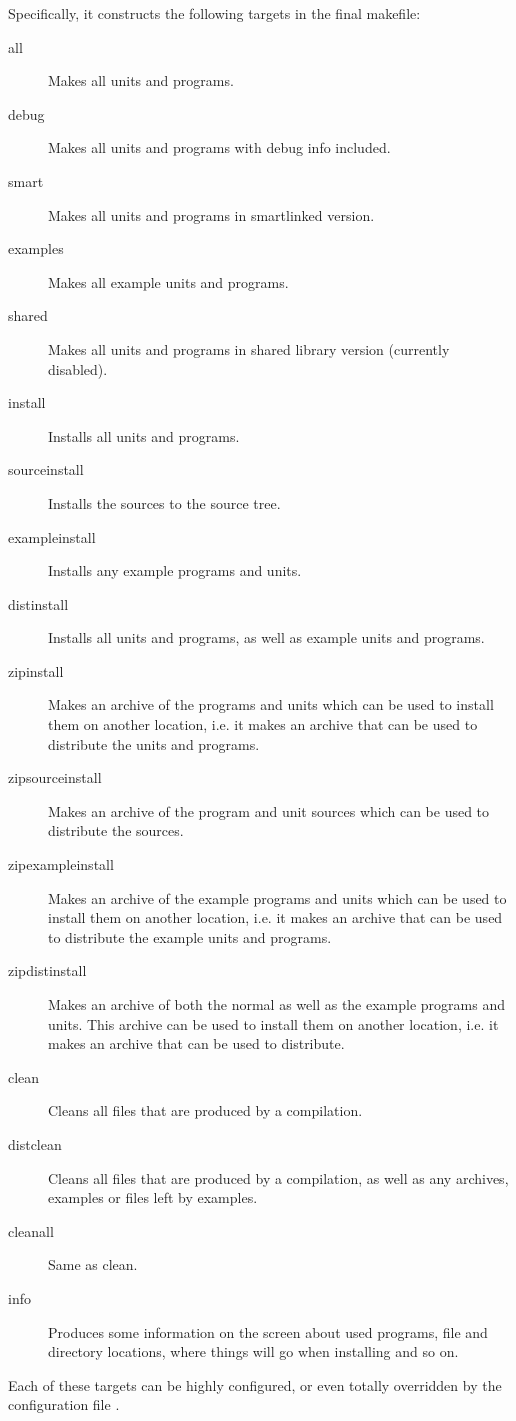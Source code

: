 Specifically, it constructs the following targets in the final makefile:
\begin{description}
\item[all] Makes all units and programs.
\item[debug] Makes all units and programs with debug info included.
\item[smart] Makes all units and programs in smartlinked version.
\item[examples] Makes all example units and programs.
\item[shared] Makes all units and programs in shared library version
(currently disabled).
\item[install] Installs all units and programs.
\item[sourceinstall] Installs the sources to the \fpc source tree.
\item[exampleinstall] Installs any example programs and units.
\item[distinstall] Installs all units and programs, as well as example units
and programs.
\item[zipinstall] Makes an archive of the programs and units which can be
used to install them on another location, i.e. it makes an archive that can
be used to distribute the units and programs.
\item[zipsourceinstall] Makes an archive of the program and unit sources
which can be used to distribute the sources.
\item[zipexampleinstall] Makes an archive of the example programs and units 
which can be used to install them on another location, i.e. it makes an 
archive that can be used to distribute the example units and programs.
\item[zipdistinstall] Makes an archive of both the normal as well as the
example programs and units. This archive can be used to install them on 
another location, i.e. it makes an archive that can be used to 
distribute.
\item[clean] Cleans all files that are produced by a compilation.
\item[distclean] Cleans all files that are produced by a compilation, as
well as any archives, examples or files left by examples.
\item[cleanall] Same as clean.
\item[info] Produces some information on the screen about used programs,
file and directory locations, where things will go when installing and so
on.
\end{description}
Each of these targets can be highly configured, or even totally overridden
by the configuration file .

